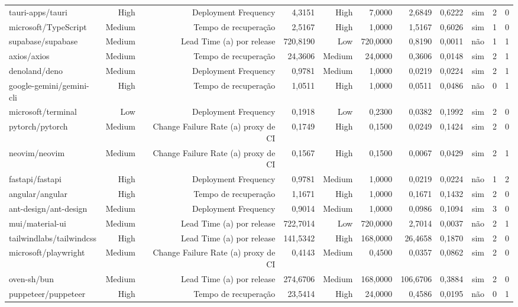 \begin{tabular}{lrrrrrrrrrr}
tauri-apps/tauri & High & Deployment Frequency & 4,3151 & High & 7,0000 & 2,6849 & 0,6222 & sim & 2 & 0 \\
microsoft/TypeScript & Medium & Tempo de recuperação & 2,5167 & High & 1,0000 & 1,5167 & 0,6026 & sim & 1 & 0 \\
supabase/supabase & Medium & Lead Time (a) por release & 720,8190 & Low & 720,0000 & 0,8190 & 0,0011 & não & 1 & 1 \\
axios/axios & Medium & Tempo de recuperação & 24,3606 & Medium & 24,0000 & 0,3606 & 0,0148 & sim & 2 & 1 \\
denoland/deno & Medium & Deployment Frequency & 0,9781 & Medium & 1,0000 & 0,0219 & 0,0224 & sim & 2 & 1 \\
google-gemini/gemini-cli & High & Tempo de recuperação & 1,0511 & High & 1,0000 & 0,0511 & 0,0486 & não & 0 & 1 \\
microsoft/terminal & Low & Deployment Frequency & 0,1918 & Low & 0,2300 & 0,0382 & 0,1992 & sim & 2 & 0 \\
pytorch/pytorch & Medium & Change Failure Rate (a) proxy de CI & 0,1749 & High & 0,1500 & 0,0249 & 0,1424 & sim & 2 & 0 \\
neovim/neovim & Medium & Change Failure Rate (a) proxy de CI & 0,1567 & High & 0,1500 & 0,0067 & 0,0429 & sim & 2 & 1 \\
fastapi/fastapi & High & Deployment Frequency & 0,9781 & Medium & 1,0000 & 0,0219 & 0,0224 & não & 1 & 2 \\
angular/angular & High & Tempo de recuperação & 1,1671 & High & 1,0000 & 0,1671 & 0,1432 & sim & 2 & 0 \\
ant-design/ant-design & Medium & Deployment Frequency & 0,9014 & Medium & 1,0000 & 0,0986 & 0,1094 & sim & 3 & 0 \\
mui/material-ui & Medium & Lead Time (a) por release & 722,7014 & Low & 720,0000 & 2,7014 & 0,0037 & não & 2 & 1 \\
tailwindlabs/tailwindcss & High & Lead Time (a) por release & 141,5342 & High & 168,0000 & 26,4658 & 0,1870 & sim & 2 & 0 \\
microsoft/playwright & Medium & Change Failure Rate (a) proxy de CI & 0,4143 & Medium & 0,4500 & 0,0357 & 0,0862 & sim & 2 & 0 \\
oven-sh/bun & Medium & Lead Time (a) por release & 274,6706 & Medium & 168,0000 & 106,6706 & 0,3884 & sim & 2 & 0 \\
puppeteer/puppeteer & High & Tempo de recuperação & 23,5414 & High & 24,0000 & 0,4586 & 0,0195 & não & 0 & 1 \\

\end{tabular}
